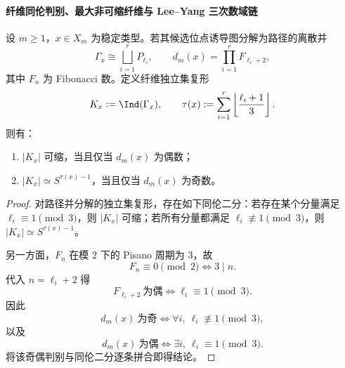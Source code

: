 \paragraph{纤维同伦判别、最大非可缩纤维与 Lee--Yang 三次数域链}

\begin{theorem}[纤维奇偶与同伦型的等价判别]\label{thm:killo-fold-fiber-homotopy-parity-equivalence}
设 \(m\ge 1\)，\(x\in X_m\) 为稳定类型。若其候选位点诱导图分解为路径的离散并
\[
\Gamma_x \cong \bigsqcup_{i=1}^{r} P_{\ell_i},
\qquad
d_m(x)=\prod_{i=1}^{r} F_{\ell_i+2},
\]
其中 \(F_n\) 为 Fibonacci 数。定义纤维独立集复形
\[
K_x:=\Ind(\Gamma_x),\qquad
\tau(x):=\sum_{i=1}^{r}\left\lfloor \frac{\ell_i+1}{3}\right\rfloor .
\]
则有：
\begin{enumerate}
  \item \(|K_x|\) 可缩，当且仅当 \(d_m(x)\) 为偶数；
  \item \(|K_x|\simeq S^{\tau(x)-1}\)，当且仅当 \(d_m(x)\) 为奇数。
\end{enumerate}
\end{theorem}
\begin{proof}
对路径并分解的独立集复形，存在如下同伦二分：若存在某个分量满足
\(\ell_i\equiv 1\pmod 3\)，则 \(|K_x|\) 可缩；若所有分量都满足
\(\ell_i\not\equiv 1\pmod 3\)，则 \(|K_x|\simeq S^{\tau(x)-1}\)。

另一方面，\(F_n\) 在模 \(2\) 下的 Pisano 周期为 \(3\)，故
\[
F_n\equiv 0\pmod 2
\iff
3\mid n.
\]
代入 \(n=\ell_i+2\) 得
\[
F_{\ell_i+2}\ \text{为偶}
\iff
\ell_i\equiv 1\pmod 3.
\]
因此
\[
d_m(x)\ \text{为奇}
\iff
\forall i,\ \ell_i\not\equiv 1\pmod 3,
\]
以及
\[
d_m(x)\ \text{为偶}
\iff
\exists i,\ \ell_i\equiv 1\pmod 3.
\]
将该奇偶判别与同伦二分逐条拼合即得结论。
\end{proof}

